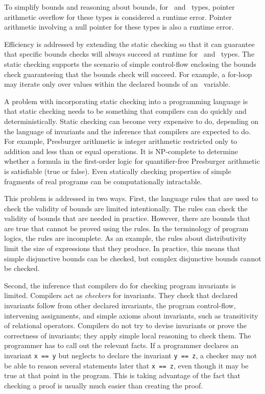 To simplify bounds and reasoning about bounds, for \arrayview\
and \arrayptr\ types, pointer arithmetic overflow for these
types is considered a runtime error. Pointer arithmetic involving a null
pointer for these types is also a runtime error.

Efficiency is addressed by extending the static checking so that it can
guarantee that specific bounds checks will always succeed at runtime for
\arrayptr\ and \arrayview\ types. The static checking
supports the scenario of simple control-flow enclosing the bounds check
guaranteeing that the bounds check will succeed. For example, a for-loop
may iterate only over values within the declared bounds of an
\arrayptr\ variable.

A problem with incorporating static checking into a programming language
is that static checking needs to be something that compilers can do
quickly and deterministically. Static checking can become very expensive
to do, depending on the language of invariants and the inference that
compilers are expected to do. For example, Presburger arithmetic is
integer arithmetic restricted only to addition and less than or equal
operations. It is NP-complete to determine whether a formula in the
first-order logic for quantifier-free Presburger arithmetic is
satisfiable (true or false). Even statically checking properties of
simple fragments of real programs can be computationally intractable.

This problem is addressed in two ways. First, the language rules that are
used to check the validity of bounds are limited intentionally.  The rules can
check the validity of bounds that are needed in practice.  However, there are
bounds that are true that cannot be proved using the rules.  In the terminology
of program logics, the rules are incomplete.  As an example, the 
rules about distributivity limit the size of
expressions that they produce.   In practice, this means that 
simple disjunctive bounds can be checked, but complex disjunctive bounds cannot be checked.
 
Second, the inference that compilers do for checking program invariants is
limited.  Compilers act as \emph{checkers} for invariants. They check that
declared invariants follow from other declared invariants, the
program control-flow, intervening assignments, and simple axioms about
invariants, such as transitivity of relational operators. Compilers
do not try to devise invariants or prove the correctness of
invariants; they apply simple local reasoning to check them. The
programmer has to call out the relevant facts. If a programmer declares
an invariant \texttt{x == y} but neglects to declare the invariant
\texttt{y == z}, a checker may not be able to reason several
statements later that \texttt{x == z}, even though it may be true at
that point in the program. This is taking advantage of the fact that
checking a proof is usually much easier than creating the proof.

